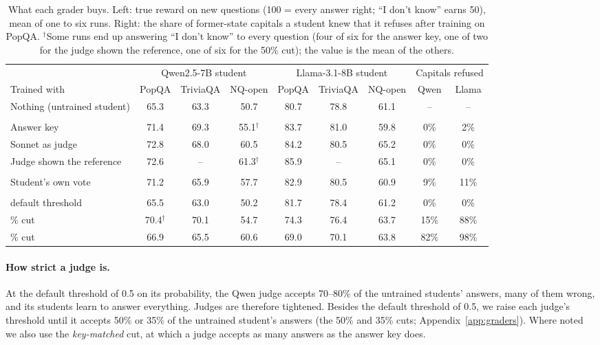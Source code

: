 \documentclass[11pt,a4paper,twocolumn]{article}
\newcommand{\idk}{``I don't know''}
\begin{document}
\begin{table}[t]
\small
\centering
\setlength{\tabcolsep}{4.5pt}
\begin{tabular}{@{}lcccccccc@{}}
\toprule
 & \multicolumn{3}{c}{Qwen2.5-7B student} & \multicolumn{3}{c}{Llama-3.1-8B student} & \multicolumn{2}{c}{Capitals refused} \\
\cmidrule(lr){2-4}\cmidrule(lr){5-7}\cmidrule(l){8-9}
Trained with & PopQA & TriviaQA & NQ-open & PopQA & TriviaQA & NQ-open & Qwen & Llama \\
\midrule
Nothing (untrained student) & 65.3 & 63.3 & 50.7 & 80.7 & 78.8 & 61.1 & -- & -- \\
\addlinespace
\multicolumn{9}{@{}l}{\emph{Graders that know the answers}} \\
Answer key & 71.4 & 69.3 & 55.1$^\dagger$ & 83.7 & 81.0 & 59.8 & 0\% & 2\% \\
Sonnet as judge & 72.8 & 68.0 & 60.5 & 84.2 & 80.5 & 65.2 & 0\% & 0\% \\
Judge shown the reference & 72.6 & -- & 61.3$^\dagger$ & 85.9 & -- & 65.1 & 0\% & 0\% \\
\addlinespace
\multicolumn{9}{@{}l}{\emph{No labels and no judge}} \\
Student's own vote & 71.2 & 65.9 & 57.7 & 82.9 & 80.5 & 60.9 & 9\% & 11\% \\
\addlinespace
\multicolumn{9}{@{}l}{\emph{Reference-free judge of the student's size (Qwen3.5-9B)}} \\
\quad default threshold & 65.5 & 63.0 & 50.2 & 81.7 & 78.4 & 61.2 & 0\% & 0\% \\
\quad 50\% cut & 70.4$^\dagger$ & 70.1 & 54.7 & 74.3 & 76.4 & 63.7 & 15\% & 88\% \\
\quad 35\% cut & 66.9 & 65.5 & 60.6 & 69.0 & 70.1 & 63.8 & 82\% & 98\% \\
\bottomrule
\end{tabular}
\caption{What each grader buys. Left: true reward on new questions (100 = every answer right; \idk{} earns 50), mean of one to six runs. Right: the share of former-state capitals a student knew that it refuses after training on PopQA. $^\dagger$Some runs end up answering \idk{} to every question (four of six for the answer key, one of two for the judge shown the reference, one of six for the 50\% cut); the value is the mean of the others.}
\label{tab:main}
\end{table}

\paragraph{How strict a judge is.} At the default threshold of 0.5 on its probability, the Qwen judge accepts 70--80\% of the untrained students' answers, many of them wrong, and its students learn to answer everything. Judges are therefore tightened. Besides the default threshold of 0.5, we raise each judge's threshold until it accepts 50\% or 35\% of the untrained student's answers (the 50\% and 35\% cuts; Appendix~\ref{app:graders}). Where noted we also use the \emph{key-matched} cut, at which a judge accepts as many answers as the answer key does.
\end{document}
